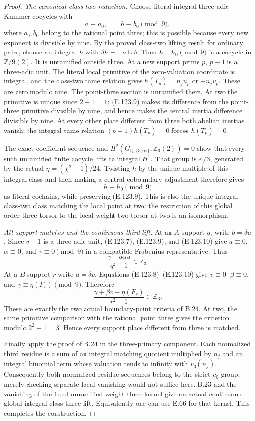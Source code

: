 \begin{proof}
\emph{The canonical class-two reduction.}
Choose literal integral three-adic Kummer cocycles with
\[
 a\equiv a_0,\qquad b\equiv b_0\pmod9,
 \tag{E.123.9}
\]
where $a_0,b_0$ belong to the rational point three; this is
possible because every new exponent is divisible by nine.
By the proved class-two lifting result for ordinary pairs,
choose an integral $h$ with $\delta h=-a\cup b$.
Then $h-h_0\pmod9$ is a cocycle in $\mathbb Z/9(2)$.
It is unramified outside three. At a new support prime $p$,
$p-1$ is a three-adic unit. The literal local primitive of
the zero-valuation coordinate is integral, and the class-two
tame relation gives $h(T_p)=n_j u_p$ or $-n_j v_p$.
These are zero modulo nine. The point-three section is
unramified there. At two the primitive is unique since
$2-1=1$; (E.123.9) makes its difference from the point-three
primitive divisible by nine, and hence makes the central
inertia difference divisible by nine. At every other place
different from three both abelian inertias vanish; the
integral tame relation $(p-1)h(T_p)=0$ forces $h(T_p)=0$.

The exact coefficient sequence and
$H^2(G_{\mathbb Q,\{3,\infty\}},\mathbb Z_3(2))=0$ show that
every such unramified finite cocycle lifts to integral
$H^1$. That group is $\mathbb Z/3$, generated by the actual
$\eta=(\chi^2-1)/24$. Twisting $h$ by the unique multiple
of this integral class and then making a central coboundary
adjustment therefore gives
\[
                   h\equiv h_0\pmod9
 \tag{E.123.10}
\]
as literal cochains, while preserving (E.123.9). This is also
the unique integral class-two class matching the local point
at two: the restriction of this global order-three torsor to
the local weight-two torsor at two is an isomorphism.

\emph{All support matches and the continuous third lift.}
At an $A$-support $q$, write $b=\delta u$. Since $q-1$ is a
three-adic unit, (E.123.7), (E.123.9), and (E.123.10) give
$u\equiv0$, $\alpha\equiv0$, and $\gamma\equiv0\pmod9$
in a compatible Frobenius representative. Thus
\[
 \frac{\gamma-q\alpha u}{q^2-1}\in\mathbb Z_3.
\]
At a $B$-support $r$ write $a=\delta v$. Equations
(E.123.8)--(E.123.10) give $v\equiv0$, $\beta\equiv0$,
and $\gamma\equiv\eta(F_r)\pmod9$. Therefore
\[
 \frac{\gamma+\beta v-\eta(F_r)}{r^2-1}
                 \in\mathbb Z_3.
\]
These are exactly the two actual boundary-point criteria of
B.24. At two, the same primitive comparison with the rational
point three gives the criterion modulo $2^2-1=3$.
Hence every support place different from three is matched.

Finally apply the proof of B.24 in the three-primary component.
Each normalized third residue is a sum of an integral matching
quotient multiplied by $n_j$ and an integral binomial term
whose valuation tends to infinity with $v_3(n_j)$.
Consequently both normalized residue sequences belong to the
strict $c_0$ group; merely checking separate local vanishing
would not suffice here. B.23 and the vanishing of the fixed
unramified weight-three kernel give an actual continuous
global integral class-three lift. Equivalently one can use
E.66 for that kernel. This completes the construction.
\end{proof}

